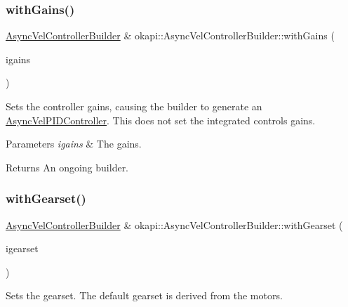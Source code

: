 \subsubsection{\texorpdfstring{withGains()}{withGains()}}
{\footnotesize\ttfamily \mbox{\hyperlink{classokapi_1_1AsyncVelControllerBuilder}{Async\+Vel\+Controller\+Builder}} \& okapi\+::\+Async\+Vel\+Controller\+Builder\+::with\+Gains (\begin{DoxyParamCaption}\item[{const \mbox{\hyperlink{structokapi_1_1IterativeVelPIDController_1_1Gains}{Iterative\+Vel\+P\+I\+D\+Controller\+::\+Gains}} \&}]{igains }\end{DoxyParamCaption})}

Sets the controller gains, causing the builder to generate an \mbox{\hyperlink{classokapi_1_1AsyncVelPIDController}{Async\+Vel\+P\+I\+D\+Controller}}. This does not set the integrated control\textquotesingle{}s gains.


\begin{DoxyParams}{Parameters}
{\em igains} & The gains. \\
\hline
\end{DoxyParams}
\begin{DoxyReturn}{Returns}
An ongoing builder. 
\end{DoxyReturn}
\mbox{\label{classokapi_1_1AsyncVelControllerBuilder_a128d0a52035c576258bc3ca10958c45f}} 
\subsubsection{\texorpdfstring{withGearset()}{withGearset()}}
{\footnotesize\ttfamily \mbox{\hyperlink{classokapi_1_1AsyncVelControllerBuilder}{Async\+Vel\+Controller\+Builder}} \& okapi\+::\+Async\+Vel\+Controller\+Builder\+::with\+Gearset (\begin{DoxyParamCaption}\item[{const \mbox{\hyperlink{structokapi_1_1AbstractMotor_1_1GearsetRatioPair}{Abstract\+Motor\+::\+Gearset\+Ratio\+Pair}} \&}]{igearset }\end{DoxyParamCaption})}

Sets the gearset. The default gearset is derived from the motor\textquotesingle{}s.


